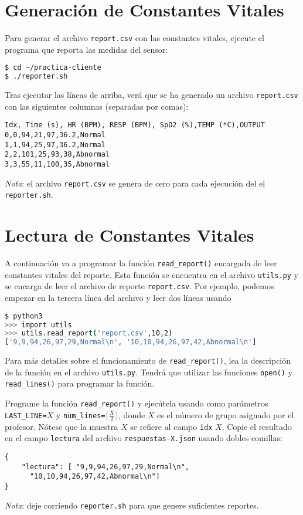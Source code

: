 \documentclass{upmassignment}
\begin{document}
\section*{Generación de Constantes Vitales}
\noindent Para generar el archivo
\texttt{report.csv} con las constantes
vitales, ejecute el programa
que reporta las medidas del sensor:
\begin{lstlisting}[language=bash]
$ cd ~/practica-cliente
$ ./reporter.sh
\end{lstlisting}
Tras ejecutar las líneas de arriba,
verá que se ha generado un archivo
\texttt{report.csv} con las siguientes
columnas (separadas por comas):
\begin{lstlisting}
Idx, Time (s), HR (BPM), RESP (BPM), SpO2 (%),TEMP (*C),OUTPUT
0,0,94,21,97,36.2,Normal
1,1,94,25,97,36.2,Normal
2,2,101,25,93,38,Abnormal
3,3,55,11,100,35,Abnormal
\end{lstlisting}
\emph{Nota}:
el archivo \texttt{report.csv} se genera
de cero para cada ejecución del
el \texttt{reporter.sh}. 


\section*{Lectura de Constantes Vitales}
\noindent 
A continuación va a programar la
función \texttt{read\_report()} encargada
de leer constantes vitales del reporte.
Esta función se encuentra en el archivo
\texttt{utils.py} y se encarga
de leer el archivo de reporte
\texttt{report.csv}. Por ejemplo,
podemos empezar en la tercera línea
del archivo y leer dos líneas usando
\begin{lstlisting}[language=bash]
$ python3
>>> import utils
>>> utils.read_report('report.csv',10,2)
['9,9,94,26,97,29,Normal\n', '10,10,94,26,97,42,Abnormal\n']
\end{lstlisting}

Para más detalles sobre el funcionamiento
de \texttt{read\_report()}, lea
la descripción de la función en el
archivo \texttt{utils.py}.
Tendrá que utilizar las funciones
\texttt{open()} y \texttt{read\_lines()}
para programar la función.


\begin{problemlist}
    \pbitem Programe la función
    \texttt{read\_report()} y
    ejecútela usando como parámetros
    \texttt{LAST\_LINE=$X$}
    y
    \texttt{num\_lines=$\lceil \tfrac{X}{2} \rceil$},
    donde $X$ es el número de grupo
    asignado por el profesor.
        Nótese que la muestra $X$
        se refiere al campo \texttt{Idx}
        $X$.
    Copie el resultado en el
    campo \texttt{lectura} del
    archivo
    \texttt{respuestas-X.json}
    usando dobles comillas:
\begin{lstlisting}
{
    "lectura": [ "9,9,94,26,97,29,Normal\n",
      "10,10,94,26,97,42,Abnormal\n"]
}
\end{lstlisting}
\end{problemlist}
\emph{Nota}: deje corriendo
\texttt{reporter.sh} para que genere
suficientes reportes.
\end{document}
